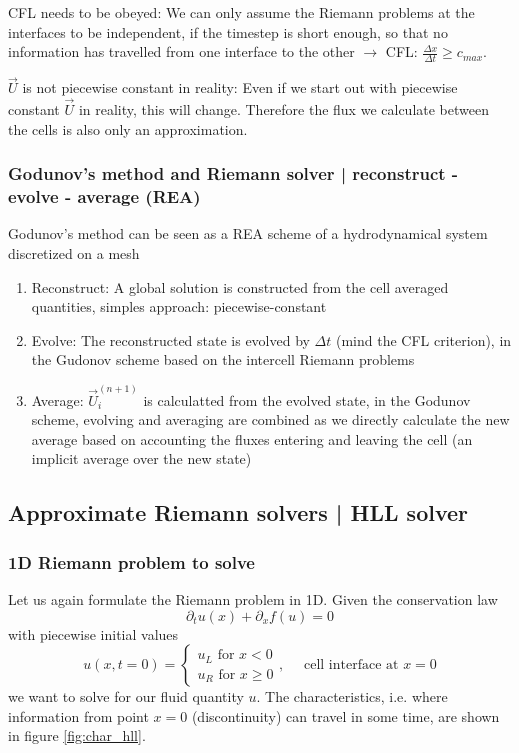 \textcolor{red1}{CFL needs to be obeyed:} We can only assume the Riemann problems at the interfaces to be independent, if the timestep is short enough, so that no information has travelled from one interface to the other $\rightarrow$ CFL: $\frac{\Delta x}{\Delta t} \geq c_{max}$.

\textcolor{red1}{$\vec{U}$ is not piecewise constant in reality:} Even if we start out with piecewise constant $\vec{U}$ in reality, this will change. Therefore the flux we calculate between the cells is also only an approximation.

\subsubsection{Godunov's method and Riemann solver | reconstruct - evolve - average (REA)}
Godunov's method can be seen as a REA scheme of a hydrodynamical system discretized on a mesh
\begin{enumerate}
    \item \textcolor{blue1}{Reconstruct:} A global solution is constructed from the cell averaged quantities, simples approach: piecewise-constant
    \item \textcolor{blue1}{Evolve:} The reconstructed state is evolved by $\Delta t$ (mind the CFL criterion), in the Gudonov scheme based on the intercell Riemann problems
    \item \textcolor{blue1}{Average:} $\vec{U}_i^{(n+1)}$ is calculatted from the evolved state, in the Godunov scheme, evolving and averaging are combined as we directly calculate the new average based on accounting the fluxes entering and leaving the cell (an implicit average over the new state)
\end{enumerate}


\subsection{Approximate Riemann solvers | HLL solver}
\subsubsection{1D Riemann problem to solve}
Let us again formulate the Riemann problem in 1D.
Given the conservation law
\begin{equation}
    \partial_t u(x) + \partial_x f(u) = 0
\end{equation}
with piecewise initial values
\begin{equation}
    u(x, t=0)=\left\{\begin{array}{l}
    u_L \text { for } x<0 \\
    u_R \text { for } x \geq 0
    \end{array}, \quad \text { cell interface at } x=0\right.
\end{equation}
we want to solve for our fluid quantity $u$. The characteristics,
i.e. where information from point $x = 0$ (discontinuity) can travel
in some time, are shown in figure \ref{fig:char_hll}.

